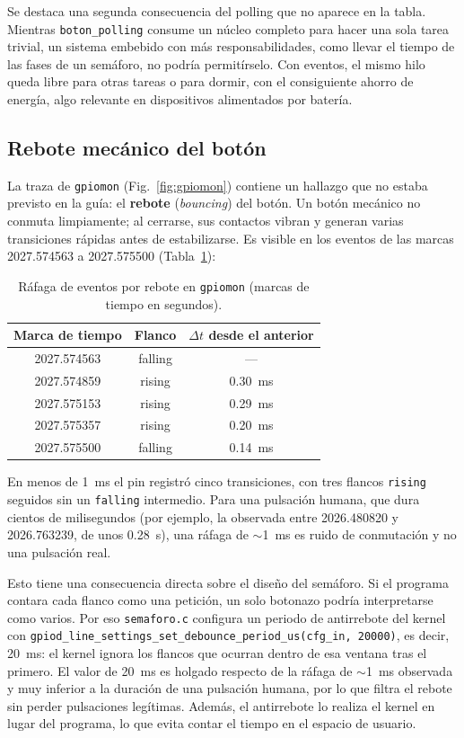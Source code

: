 \documentclass[conference]{IEEEtran}
\begin{document}
Se destaca una segunda consecuencia del polling que no aparece en la tabla. Mientras \texttt{boton\_polling} consume un núcleo completo para hacer una sola tarea trivial, un sistema embebido con más responsabilidades, como llevar el tiempo de las fases de un semáforo, no podría permitírselo. Con eventos, el mismo hilo queda libre para otras tareas o para dormir, con el consiguiente ahorro de energía, algo relevante en dispositivos alimentados por batería.

\subsection{Rebote mecánico del botón}
La traza de \texttt{gpiomon} (Fig.~\ref{fig:gpiomon}) contiene un hallazgo que no estaba previsto en la guía: el \textbf{rebote} (\textit{bouncing}) del botón. Un botón mecánico no conmuta limpiamente; al cerrarse, sus contactos vibran y generan varias transiciones rápidas antes de estabilizarse. Es visible en los eventos de las marcas 2027.574563 a 2027.575500 (Tabla~\ref{tab:rebote}):

\begin{table}[t]
	\centering
	\caption{Ráfaga de eventos por rebote en \texttt{gpiomon} (marcas de tiempo en segundos).}
	\label{tab:rebote}
	\begin{tabular}{|c|c|c|}
		\hline
		\textbf{Marca de tiempo} & \textbf{Flanco} & \textbf{$\Delta t$ desde el anterior} \\
		\hline
		2027.574563 & falling & --- \\
		\hline
		2027.574859 & rising & 0.30~ms \\
		\hline
		2027.575153 & rising & 0.29~ms \\
		\hline
		2027.575357 & rising & 0.20~ms \\
		\hline
		2027.575500 & falling & 0.14~ms \\
		\hline
	\end{tabular}
\end{table}

En menos de 1~ms el pin registró cinco transiciones, con tres flancos \texttt{rising} seguidos sin un \texttt{falling} intermedio. Para una pulsación humana, que dura cientos de milisegundos (por ejemplo, la observada entre 2026.480820 y 2026.763239, de unos 0.28~s), una ráfaga de $\sim$1~ms es ruido de conmutación y no una pulsación real.

Esto tiene una consecuencia directa sobre el diseño del semáforo. Si el programa contara cada flanco como una petición, un solo botonazo podría interpretarse como varios. Por eso \texttt{semaforo.c} configura un periodo de antirrebote del kernel con \texttt{gpiod\_line\_settings\_set\_debounce\_period\_us(cfg\_in, 20000)}, es decir, 20~ms: el kernel ignora los flancos que ocurran dentro de esa ventana tras el primero. El valor de 20~ms es holgado respecto de la ráfaga de $\sim$1~ms observada y muy inferior a la duración de una pulsación humana, por lo que filtra el rebote sin perder pulsaciones legítimas. Además, el antirrebote lo realiza el kernel en lugar del programa, lo que evita contar el tiempo en el espacio de usuario.
\end{document}
